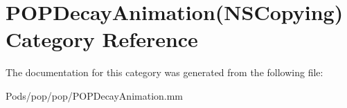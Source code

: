 \hypertarget{category_p_o_p_decay_animation_07_n_s_copying_08}{}\section{P\+O\+P\+Decay\+Animation(N\+S\+Copying) Category Reference}
\label{category_p_o_p_decay_animation_07_n_s_copying_08}


The documentation for this category was generated from the following file\+:\begin{DoxyCompactItemize}
\item 
Pods/pop/pop/P\+O\+P\+Decay\+Animation.\+mm\end{DoxyCompactItemize}
